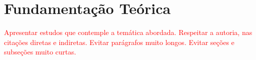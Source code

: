 
\chapter{Fundamentação Teórica}
\label{chap:fundam}

\textcolor{red}{Apresentar estudos que contemple a temática abordada. Respeitar a autoria,
nas citações diretas e indiretas. Evitar parágrafos muito longos. Evitar seções e
subseções muito curtas.}
